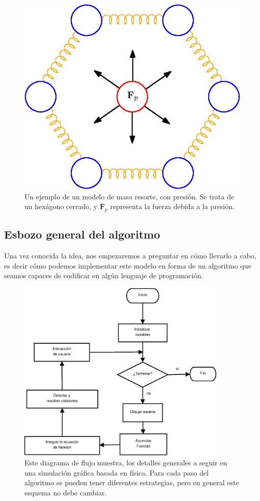 \begin{figure}
 \centering
 \includegraphics[]{Img/02/modelo}
 \caption[Diagrama del modelo masa, resorte, y presión]{ 
 Un ejemplo de un modelo de masa resorte, con presión. Se trata de un hexágono cerrado, y $\textbf{F}_p$ representa la fuerza debida a la presión.
 } \label{modelo:fig}
\end{figure}

\subsection{Esbozo general del algoritmo}
Una vez conocida la idea, nos empezaremos a preguntar en cómo llevarlo a cabo, es decir cómo podemos implementar este modelo en forma de un algoritmo que seamos capaces de codificar en algún lenguaje de programación.


\begin{figure}
 \centering
 \includegraphics[width=10cm]{Img/02/diagrama_flujo}
 \caption[Diagrama de flujo de la simulación]{ 
 Este diagrama de flujo muestra, los detalles generales a seguir en una simulación gráfica basada en física. Para cada paso del algoritmo se pueden tener diferentes estrategias, pero en general este esquema no debe cambiar.
 } \label{diagrama_flujo:fig}
\end{figure}

